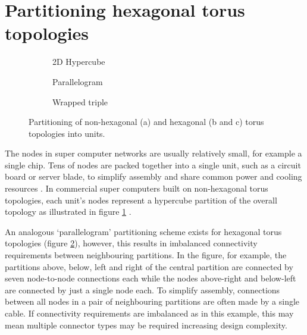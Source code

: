 	\section{Partitioning hexagonal torus topologies}
		
		\begin{figure}
			\center
			\begin{subfigure}[b]{0.32\textwidth}
				\center
				\caption{2D Hypercube}
				\label{fig:hypercube-partitioning}
			\end{subfigure}
			\begin{subfigure}[b]{0.32\textwidth}
				\center
				\caption{Parallelogram}
				\label{fig:parallelogram-partitioning}
			\end{subfigure}
			\begin{subfigure}[b]{0.32\textwidth}
				\center
				\caption{Wrapped triple}
				\label{fig:wrapped-triple-partitioning}
			\end{subfigure}
			
			\caption{Partitioning of non-hexagonal (a) and hexagonal (b and c) torus
			topologies into units.}
			\label{fig:partitioning-options}
		\end{figure}
		
		The nodes in super computer networks are usually relatively small, for
		example a single chip. Tens of nodes are packed together into a single
		unit, such as a circuit board or server blade, to simplify assembly and
		share common power and cooling resources \cite{gilge14,ajima12}. In
		commercial super computers built on non-hexagonal torus topologies, each
		unit's nodes represent a hypercube partition of the overall topology as
		illustrated in figure \ref{fig:hypercube-partitioning}
		\cite{chen11,ajima12}.
		
		An analogous `parallelogram' partitioning scheme exists for hexagonal torus
		topologies (figure \ref{fig:parallelogram-partitioning}), however, this
		results in imbalanced connectivity requirements between neighbouring
		partitions. In the figure, for example, the partitions above, below, left and
		right of the central partition are connected by seven node-to-node
		connections each while the nodes above-right and below-left are connected
		by just a single node each. To simplify assembly, connections between all
		nodes in a pair of neighbouring partitions are often made by a single
		cable. If connectivity requirements are imbalanced as in this example, this
		may mean multiple connector types may be required increasing design
		complexity.
		
